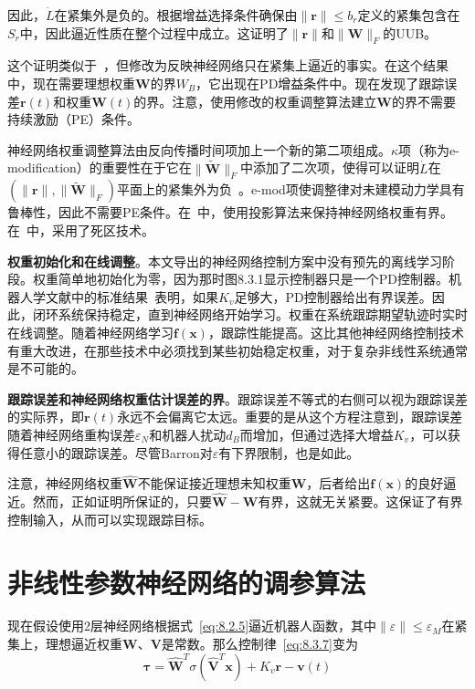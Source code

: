 \documentclass[12pt,a4paper]{ctexart}
\begin{document}
因此，$\dot{L}$在紧集外是负的。根据增益选择条件确保由$\|\bm{r}\| \leq b_r$定义的紧集包含在$S_r$中，因此逼近性质在整个过程中成立。这证明了$\|\bm{r}\|$和$\|\bm{W}\|_F$的UUB。

这个证明类似于~\cite{narendra1987}，但修改为反映神经网络只在紧集上逼近的事实。在这个结果中，现在需要理想权重$\bm{W}$的界$W_B$，它出现在PD增益条件中。现在发现了跟踪误差$\bm{r}(t)$和权重$\bm{W}(t)$的界。注意，使用修改的权重调整算法建立$\bm{W}$的界不需要持续激励（PE）条件。

神经网络权重调整算法由反向传播时间项加上一个新的第二项组成。$\kappa$项（称为e-modification）的重要性在于它在$\|\tilde{\bm{W}}\|_F$中添加了二次项，使得可以证明$\dot{L}$在$(\|\bm{r}\|, \|\tilde{\bm{W}}\|_F)$平面上的紧集外为负~\cite{narendra1987}。e-mod项使调整律对未建模动力学具有鲁棒性，因此不需要PE条件。在~\cite{polycarpou1991}中，使用投影算法来保持神经网络权重有界。在~\cite{chen1992,chen1994}中，采用了死区技术。

\textbf{权重初始化和在线调整}。本文导出的神经网络控制方案中没有预先的离线学习阶段。权重简单地初始化为零，因为那时图8.3.1显示控制器只是一个PD控制器。机器人学文献中的标准结果~\cite{dawson1990}表明，如果$K_v$足够大，PD控制器给出有界误差。因此，闭环系统保持稳定，直到神经网络开始学习。权重在系统跟踪期望轨迹时实时在线调整。随着神经网络学习$\bm{f}(\bm{x})$，跟踪性能提高。这比其他神经网络控制技术有重大改进，在那些技术中必须找到某些初始稳定权重，对于复杂非线性系统通常是不可能的。

\textbf{跟踪误差和神经网络权重估计误差的界}。跟踪误差不等式的右侧可以视为跟踪误差的实际界，即$\bm{r}(t)$永远不会偏离它太远。重要的是从这个方程注意到，跟踪误差随着神经网络重构误差$\varepsilon_N$和机器人扰动$d_B$而增加，但通过选择大增益$K_v$，可以获得任意小的跟踪误差。尽管Barron对$\varepsilon$有下界限制，也是如此。

注意，神经网络权重$\hat{\bm{W}}$不能保证接近理想未知权重$\bm{W}$，后者给出$\bm{f}(\bm{x})$的良好逼近。然而，正如证明所保证的，只要$\hat{\bm{W}} - \bm{W}$有界，这就无关紧要。这保证了有界控制输入，从而可以实现跟踪目标。

\section{非线性参数神经网络的调参算法}

现在假设使用2层神经网络根据式~\eqref{eq:8.2.5}逼近机器人函数，其中$\|\varepsilon\| \leq \varepsilon_M$在紧集上，理想逼近权重$\bm{W}$、$\bm{V}$是常数。那么控制律~\eqref{eq:8.3.7}变为
\begin{equation}\label{eq:8.5.1}
\bm{\tau} = \hat{\bm{W}}^T \sigma(\hat{\bm{V}}^T \bm{x}) + K_v\bm{r} - \bm{v}(t)
\end{equation}
\end{document}
